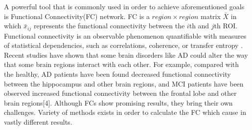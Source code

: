 \documentclass[journal]{IEEEtran}
\begin{document}
	
	
	A powerful tool that is commonly used in order to achieve aforementioned goals is Functional Connectivity(FC) network.  FC is a $region \times region$ matrix $\bar{X}$ in which $\bar{x}_{ij}$ represents the functional connectivity between the $i$th and $j$th ROI. Functional connectivity is an observable
	phenomenon quantifiable with measures of statistical dependencies, such as correlations, coherence, or transfer entropy \cite{r38}.  Recent studies have shown that some brain disorders like AD could alter the way that some brain regions interact with each other. For example, compared with the healthy, AD patients have been found decreased functional connectivity between the hippocampus and other brain regions, and MCI patients have been observed increased functional connectivity between the frontal lobe and other brain regions[4]. 
	Although FCs show promising results, they bring their own challenges. 
	Variety of methods exists in order to calculate the FC which cause in vastly different results. 
	
\end{document}

